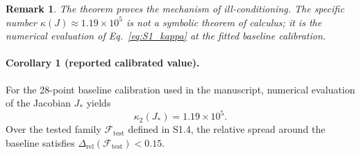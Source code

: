 \documentclass[11pt]{article}
\newtheorem{remark}{Remark}
\begin{document}
\begin{remark}
The theorem proves the \emph{mechanism} of ill-conditioning. The specific number
\(\kappa(J)\approx 1.19\times 10^5\) is not a symbolic theorem of calculus; it is the numerical
evaluation of Eq.~\eqref{eq:S1_kappa} at the fitted baseline calibration.
\end{remark}

\paragraph{Corollary 1 (reported calibrated value).}
For the 28-point baseline calibration used in the manuscript, numerical evaluation of the
Jacobian \(J_*\) yields
\begin{equation}
\kappa_2(J_*)=1.19\times 10^5.
\label{eq:S1_kappa_reported}
\end{equation}
Over the tested family \(\mathcal F_{\mathrm{test}}\) defined in S1.4, the relative spread around the
baseline satisfies \(\Delta_{\mathrm{rel}}(\mathcal F_{\mathrm{test}})<0.15\).

\end{document}
